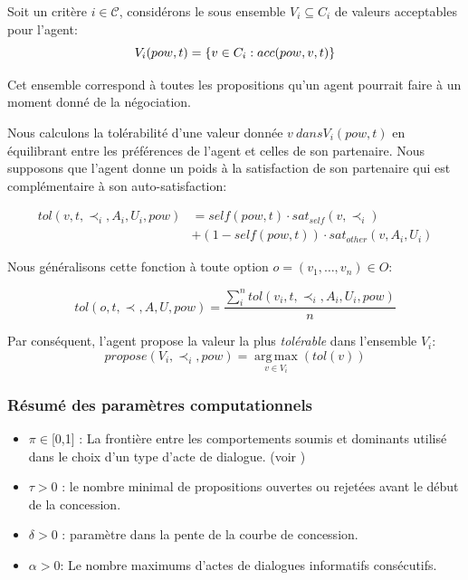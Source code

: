 		
		Soit un critère $i\in\mathcal{C}$, considérons le sous ensemble $V_i\subseteq C_i$ de valeurs acceptables pour l'agent:
		\vspace{-0.5em} 
		\begin{equation}
		V_i(pow,t) = \{ v\in C_i : acc(pow,v,t) \}
		\vspace{-0.5em}
		\end{equation}
		
		Cet ensemble correspond à toutes les propositions qu'un agent pourrait faire à un moment donné de la négociation.
		
		Nous calculons la tolérabilité d'une valeur donnée $ v \ dans V_i (pow, t) $ en équilibrant entre les préférences de l'agent et celles de son partenaire. Nous supposons que l'agent donne un poids à la satisfaction de son partenaire qui est complémentaire à son auto-satisfaction:
		
		\begin{equation}
		\begin{split}
		tol(v, t, \prec_i, A_i, U_i, pow) & = self(pow, t)  \cdot sat_{self}(v, \prec_i) \\
		& +  (1 - self(pow, t)) \cdot sat_{other}(v, A_i, U_i)
		\end{split} 
		\end{equation}
		
		\noindent
		Nous généralisons cette fonction à toute option $o=(v_1,\ldots,v_n) \in O$:
		
		\begin{equation}
		tol(o, t, \prec, A, U, pow) = \frac{ \sum_{i}^{n} tol(v_i, t, \prec_i, A_i, U_i, pow) } {n}
		\end{equation}
		
		\noindent
		Par conséquent, l'agent propose la valeur la plus \emph{tolérable} dans l'ensemble $V_i$:
		\begin{equation}
		propose(V_i, \prec_i,pow) =  \operatorname*{arg\,max}_{v \in V_i} ( tol(v))
		\end{equation}
		
		\subsubsection*{Résumé des paramètres computationnels}
		\begin{itemize}[noitemsep]
			
			\item $\pi \in $[0,1] : La frontière entre  les comportements soumis et dominants utilisé dans le choix d'un type d'acte de dialogue. (voir )
			\item $\tau > 0$ : le nombre minimal de propositions ouvertes ou rejetées avant le début de la concession.
			\item $\delta > 0$ : paramètre dans la pente de la courbe de concession.
			\item $\alpha> 0$: Le nombre maximums d'actes de dialogues informatifs consécutifs.
		\end{itemize}
	
